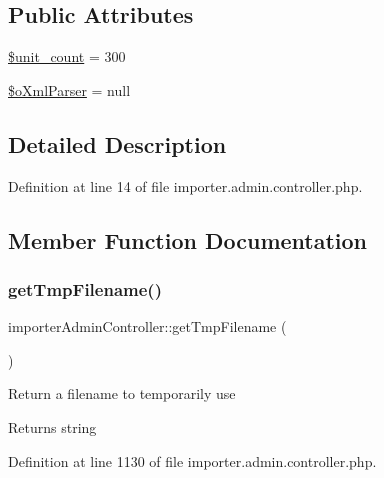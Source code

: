 \subsection*{Public Attributes}
\begin{DoxyCompactItemize}
\item 
\hyperlink{classimporterAdminController_ac425370d30482b23546a0a16da75792c}{\$unit\+\_\+count} = 300
\item 
\hyperlink{classimporterAdminController_a7f08bd88a5e7eeea00c7f201438d1b1b}{\$o\+Xml\+Parser} = null
\end{DoxyCompactItemize}


\subsection{Detailed Description}


Definition at line 14 of file importer.\+admin.\+controller.\+php.



\subsection{Member Function Documentation}
\hypertarget{classimporterAdminController_a007ae310ca94fb49d96bcdfa3688cb6d}{}\label{classimporterAdminController_a007ae310ca94fb49d96bcdfa3688cb6d} 
\subsubsection{\texorpdfstring{get\+Tmp\+Filename()}{getTmpFilename()}}
{\footnotesize\ttfamily importer\+Admin\+Controller\+::get\+Tmp\+Filename (\begin{DoxyParamCaption}{ }\end{DoxyParamCaption})}

Return a filename to temporarily use \begin{DoxyReturn}{Returns}
string 
\end{DoxyReturn}


Definition at line 1130 of file importer.\+admin.\+controller.\+php.

\hypertarget{classimporterAdminController_a259bb7d8ae0b653dc45e544af3100753}{}\label{classimporterAdminController_a259bb7d8ae0b653dc45e544af3100753} 
